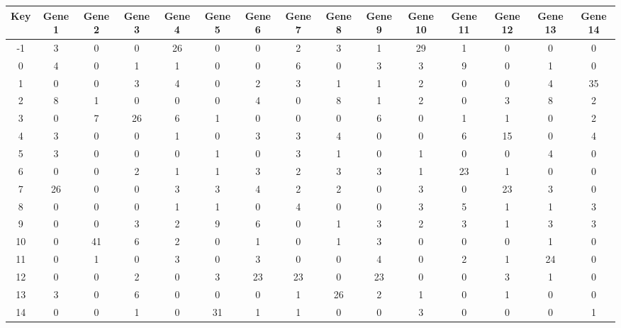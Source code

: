 \begin{tabular}{|c|c|c|c|c|c|c|c|c|c|c|c|c|c|c|}
\hline
Key & Gene 1 & Gene 2 & Gene 3 & Gene 4 & Gene 5 & Gene 6 & Gene 7 & Gene 8 & Gene 9 & Gene 10 & Gene 11 & Gene 12 & Gene 13 & Gene 14 \\
\hline
-1 & 3 & 0 & 0 & 26 & 0 & 0 & 2 & 3 & 1 & 29 & 1 & 0 & 0 & 0 \\
0 & 4 & 0 & 1 & 1 & 0 & 0 & 6 & 0 & 3 & 3 & 9 & 0 & 1 & 0 \\
1 & 0 & 0 & 3 & 4 & 0 & 2 & 3 & 1 & 1 & 2 & 0 & 0 & 4 & 35 \\
2 & 8 & 1 & 0 & 0 & 0 & 4 & 0 & 8 & 1 & 2 & 0 & 3 & 8 & 2 \\
3 & 0 & 7 & 26 & 6 & 1 & 0 & 0 & 0 & 6 & 0 & 1 & 1 & 0 & 2 \\
4 & 3 & 0 & 0 & 1 & 0 & 3 & 3 & 4 & 0 & 0 & 6 & 15 & 0 & 4 \\
5 & 3 & 0 & 0 & 0 & 1 & 0 & 3 & 1 & 0 & 1 & 0 & 0 & 4 & 0 \\
6 & 0 & 0 & 2 & 1 & 1 & 3 & 2 & 3 & 3 & 1 & 23 & 1 & 0 & 0 \\
7 & 26 & 0 & 0 & 3 & 3 & 4 & 2 & 2 & 0 & 3 & 0 & 23 & 3 & 0 \\
8 & 0 & 0 & 0 & 1 & 1 & 0 & 4 & 0 & 0 & 3 & 5 & 1 & 1 & 3 \\
9 & 0 & 0 & 3 & 2 & 9 & 6 & 0 & 1 & 3 & 2 & 3 & 1 & 3 & 3 \\
10 & 0 & 41 & 6 & 2 & 0 & 1 & 0 & 1 & 3 & 0 & 0 & 0 & 1 & 0 \\
11 & 0 & 1 & 0 & 3 & 0 & 3 & 0 & 0 & 4 & 0 & 2 & 1 & 24 & 0 \\
12 & 0 & 0 & 2 & 0 & 3 & 23 & 23 & 0 & 23 & 0 & 0 & 3 & 1 & 0 \\
13 & 3 & 0 & 6 & 0 & 0 & 0 & 1 & 26 & 2 & 1 & 0 & 1 & 0 & 0 \\
14 & 0 & 0 & 1 & 0 & 31 & 1 & 1 & 0 & 0 & 3 & 0 & 0 & 0 & 1 \\
\hline
\end{tabular}